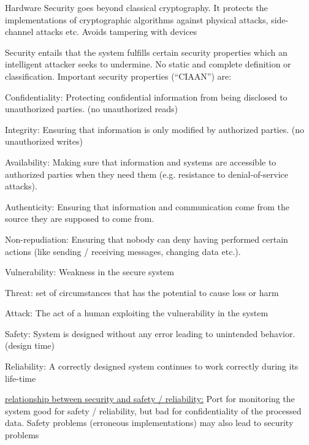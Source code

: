 \documentclass[landscape, a4paper]{article}
\begin{document}
\fontsize{4pt}{5pt}\selectfont

\begin{minipage}[t]{0.198\pagewidth}
	\begin{betterlist}
		\item \alert{Hardware Security} goes beyond classical cryptography. It protects the implementations of cryptographic algorithms against physical attacks, side-channel attacks etc. Avoids tampering with devices
		\item \alert{Security} entails that the system fulfills certain security properties which an intelligent attacker seeks to undermine. No static and complete definition or classification. \alert{Important security properties (\enquote{CIAAN}) are:}
		\begin{betterlist}
			\item \alert{Confidentiality:} Protecting confidential information from being disclosed to unauthorized parties. (no unauthorized reads)
			\item \alert{Integrity:} Ensuring that information is only modified by authorized parties. (no unauthorized writes)
			\item \alert{Availability:} Making sure that information and systems are accessible to authorized parties when they need them (e.g. resistance to denial-of-service attacks).
			\item \alert{Authenticity:} Ensuring that information and communication come from the source they are supposed to come from.
			\item \alert{Non-repudiation:} Ensuring that nobody can deny having performed certain actions (like sending / receiving messages, changing data etc.).
		\end{betterlist}
		\item \alert{Vulnerability:} Weakness in the secure system
		\item \alert{Threat:} set of circumstances that has the potential to cause loss or harm
		\item \alert{Attack:} The act of a human exploiting the vulnerability in the system
		\item \alert{Safety:} System is designed without any error leading to unintended behavior. (\alert{design time})
		\item \alert{Reliability:} A correctly designed system continues to work correctly during its \alert{life-time}
		\begin{betterlist}
			\item \underline{relationship between security and safety / reliability:} Port for monitoring the system good for safety / reliability, but bad for confidentiality of the processed data. Safety problems (erroneous implementations) may also lead to security problems

\end{betterlist}
\end{betterlist}
\end{minipage}
\end{document}
